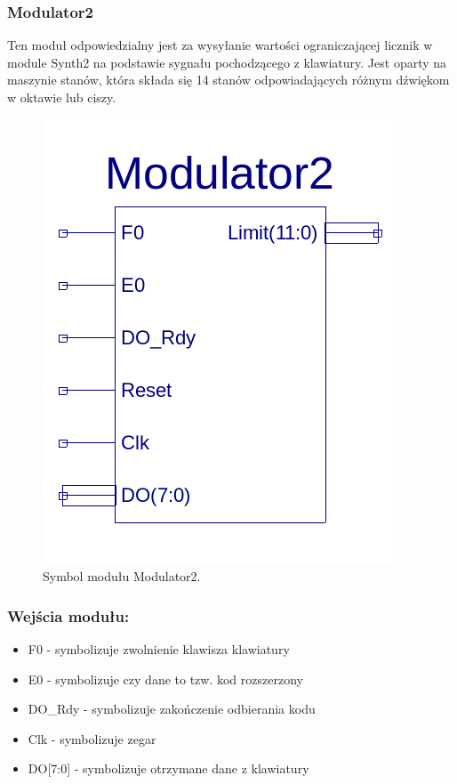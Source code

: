 \documentclass[a4paper,11pt]{article}
\begin{document}
\subsubsection{Modulator2}
Ten moduł odpowiedzialny jest za wysyłanie wartości ograniczającej licznik w module Synth2 na podstawie sygnału pochodzącego z klawiatury. Jest oparty na maszynie stanów, która składa się 14 stanów odpowiadających różnym dźwiękom w oktawie lub ciszy.

\begin{figure}[H]
\center
\includegraphics[scale=0.5]{modulatorSymb.png}
\caption{Symbol modułu Modulator2.}
\end{figure}

\subsubsection*{Wejścia modułu:}
\begin{itemize}
\item F0 - symbolizuje zwolnienie klawisza klawiatury
\item E0 - symbolizuje czy dane to tzw. kod rozszerzony
\item DO_Rdy - symbolizuje zakończenie odbierania kodu
\item Clk - symbolizuje zegar
\item DO[7:0] - symbolizuje otrzymane dane z klawiatury
\end{itemize}
\end{document}
